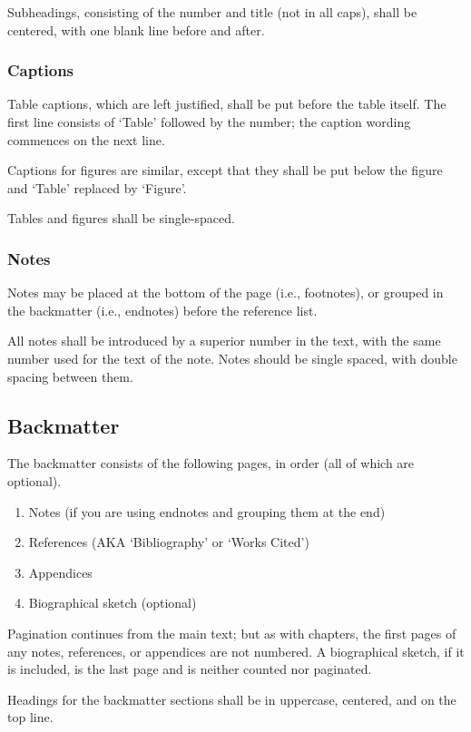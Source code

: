    Subheadings, consisting of the number and title (not in all caps), 
shall be centered, with one blank line before and after.

\subsubsection{Captions}

Table captions, which are left justified, shall be put before the table 
itself. The first line consists of `Table' followed by the number; the caption
wording commences on the next line.

Captions for figures are similar, except that they shall be put below the 
figure and `Table' replaced by `Figure'.

Tables and figures shall be single-spaced.

\subsubsection{Notes}

    Notes may be placed at the bottom of the page (i.e., footnotes), or
grouped in the backmatter (i.e., endnotes) before the reference list.

    All notes shall be introduced by a superior number in the text, with
the same number used for the text of the note. Notes should be single spaced,
with double spacing between them.

\subsection{Backmatter}

    The backmatter consists of the following pages, in order (all of which
are optional).
\begin{enumerate}
\item Notes (if you are using endnotes and grouping them at the end)
\item References (AKA `Bibliography' or `Works Cited')
\item Appendices
\item Biographical sketch (optional)
\end{enumerate}

    Pagination continues from the main text; but as with chapters, the first
pages of any notes, references, or appendices are not numbered. A biographical
sketch, if it is included, is the last page and is neither counted
nor paginated.

    Headings for the backmatter sections shall be in uppercase, centered, and
on the top line.

